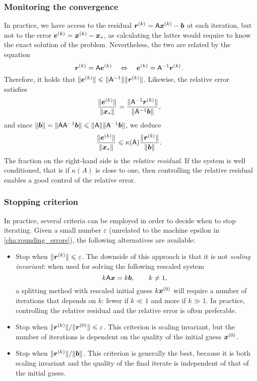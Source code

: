 \subsubsection{Monitoring the convergence}
\label{ssub:monitoring_the_convergence}
In practice,
we have access to the residual $\mathbf{\boldsymbol{r}}^{(k)} = \mathsf A \mathbf{\boldsymbol{x}}^{(k)} - \mathbf{\boldsymbol{b}}$ at each iteration,
but not to the error $\mathbf{\boldsymbol{e}}^{(k)} = \mathbf{\boldsymbol{x}}^{(k)} - \mathbf{\boldsymbol{x}}_*$,
as calculating the latter would require to know the exact solution of the problem.
Nevertheless,
the two are related by the equation
\[
    \mathbf{\boldsymbol{r}}^{(k)} = \mathsf A \mathbf{\boldsymbol{e}}^{(k)}
    \quad \Leftrightarrow \quad \mathbf{\boldsymbol{e}}^{(k)} = \mathsf A^{-1} \mathbf{\boldsymbol{r}}^{(k)}.
\]
Therefore, it holds that $\lVert\mathbf{\boldsymbol{e}}^{(k)}\rVert \leqslant \lVert\mathsf A^{-1}\rVert \lVert\mathbf{\boldsymbol{r}}^{(k)}\rVert$.
Likewise, the relative error satisfies
\[
     \frac{\lVert\mathbf{\boldsymbol{e}}^{(k)}\rVert}{\lVert\mathbf{\boldsymbol{x}}_*\rVert}
     = \frac{\lVert\mathsf A^{-1} \mathbf{\boldsymbol{r}}^{(k)}\rVert}{\lVert\mathsf A^{-1} \mathbf{\boldsymbol{b}}\rVert},
\]
and since $\lVert\mathbf{\boldsymbol{b}}\rVert = \lVert\mathsf A \mathsf A^{-1} \mathbf{\boldsymbol{b}}\rVert \leqslant \lVert\mathsf A\rVert \lVert\mathsf A^{-1} \mathbf{\boldsymbol{b}}\rVert$,
we deduce
\[
    \frac{\lVert\mathbf{\boldsymbol{e}}^{(k)}\rVert}{\lVert\mathbf{\boldsymbol{x}}_*\rVert}
     \leqslant \kappa(\mathsf A) \frac{\lVert\mathbf{\boldsymbol{r}}^{(k)}\rVert}{\lVert\mathbf{\boldsymbol{b}}\rVert}.
\]
The fraction on the right-hand side is the \emph{relative residual}.
If the system is well conditioned,
that is if $\kappa(A)$ is close to one,
then controlling the relative residual enables a good control of the relative error.

\subsubsection{Stopping criterion}%
\label{ssub:stopping_criterion}

In practice,
several criteria can be employed in order to decide when to stop iterating.
Given a small number $\varepsilon$ (unrelated to the machine epsilon in \cref{cha:rounding_errors}),
the following alternatives are available:
\begin{itemize}
    \item
        Stop when $\lVert\mathbf{\boldsymbol{r}}^{(k)}\rVert \leqslant \varepsilon$.
        The downside of this approach is that
        it is not \emph{scaling invariant}:
        when used for solving the following rescaled system
        \[
            k \mathsf A \mathbf{\boldsymbol{x}} = k \mathbf{\boldsymbol{b}}, \qquad k \neq 1,
        \]
        a splitting method with rescaled initial guess $k \mathbf{\boldsymbol{x}}^{(0)}$
        will require a number of iterations that depends on $k$:
        fewer if $k \ll 1$ and more if $k \gg 1$.
        In practice, controlling the relative residual and the relative error is often preferable.

    \item
        Stop when $\lVert\mathbf{\boldsymbol{r}}^{(k)}\rVert / \lVert\mathbf{\boldsymbol{r}}^{(0)}\rVert \leqslant \varepsilon$.
        This criterion is scaling invariant,
        but the number of iterations is dependent on the quality of the initial guess $\mathbf{\boldsymbol{x}}^{(0)}$.

    \item
        Stop when $\lVert\mathbf{\boldsymbol{r}}^{(k)}\rVert / \lVert\mathbf{\boldsymbol{b}}\rVert$.
        This criterion is generally the best,
        because it is both scaling invariant and the quality of the final iterate is independent of that of the initial guess.
\end{itemize}

